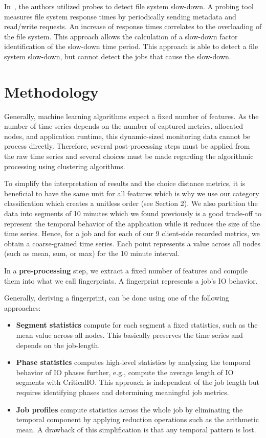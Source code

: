 \documentclass[]{llncs}
\begin{document}
In~\cite{TUISVPKB19}, the authors utilized probes to detect file system slow-down.
A probing tool measures file system response times by periodically sending metadata and read/write requests.
An increase of response times correlates to the overloading of the file system.
This approach allows the calculation of a slow-down factor identification of the slow-down time period.
This approach is able to detect a file system slow-down, but cannot detect the jobs that cause the slow-down.

\section{Methodology}
Generally, machine learning algorithms expect a fixed number of features.
As the number of time series  depends on the number of captured metrics, allocated nodes, and application runtime, this dynamic-sized monitoring data cannot be process directly.
Therefore, several post-processing steps must be applied from the raw time series and several choices must be made regarding the algorithmic processing using clustering algorithms.

To simplify the interpretation of results and the choice distance metrics, it is beneficial to have the same unit for all features which is why we use our category classification which creates a unitless order (see Section 2).
We also partition the data into segments of 10 minutes which we found previously is a good trade-off to represent the temporal behavior of the application while it reduces the size of the time series.
Hence, for a job and for each of our 9 client-side recorded metrics, we obtain a coarse-grained time series.
Each point represents a value across all nodes (such as mean, sum, or max) for the 10 minute interval.

In a \textbf{pre-processing} step, we extract a fixed number of features and compile them into what we call fingerprints.
A fingerprint represents a job's IO behavior.

Generally, deriving a fingerprint, can be done using one of the following approaches:


\begin{itemize}
	\item \textbf{Segment statistics} compute for each segment a fixed statistics, such as the mean value across all nodes.
		This basically preserves the time series and depends on the job-length.
	\item \textbf{Phase statistics} computes high-level statistics by analyzing the temporal behavior of IO phases further, e.g., compute the average length of IO segments with CriticalIO.
		This approach is independent of the job length but requires identifying phases and determining meaningful job metrics.
	\item \textbf{Job profiles} compute statistics across the whole job by eliminating the temporal component by applying reduction operations such as the arithmetic mean.
		A drawback of this simplification is that any temporal pattern is lost.
\end{itemize}
\end{document}
